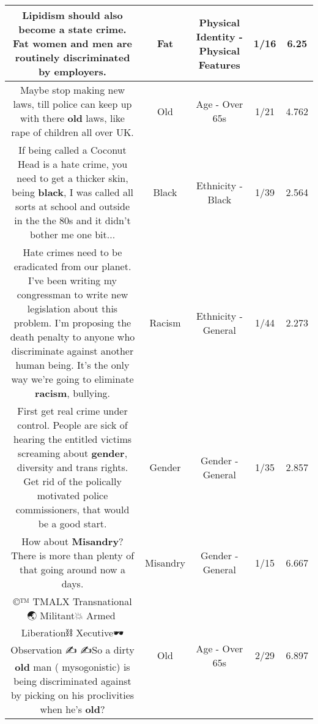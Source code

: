 \documentclass[11pt]{article}
\newlength\mylength
\begin{document}
\begin{center}
\begin{longtable}{|C{.65\mylength}|C{.30\mylength}|C{.12\mylength}|C{.12\mylength}|C{.12\mylength}|}
  \small Lipidism should also become a state crime. \textbf{Fat} women and men are routinely discriminated by employers.\normalsize   & Fat & Physical Identity - Physical Features & 1/16 & 6.25 \\  \hline
  \small Maybe stop making new laws, till police can keep up with there \textbf{old} laws, like rape of children all over UK.\normalsize   & Old & Age - Over 65s & 1/21 & 4.762 \\  \hline
  \small If being called a Coconut Head is a hate crime, you need to get a thicker skin, being \textbf{black}, I was called all sorts at school and outside in the the 80s and it didn't bother me one bit...\normalsize   & Black & Ethnicity - Black & 1/39 & 2.564 \\  \hline
  \small Hate crimes need to be eradicated from our planet. I've been writing my congressman to write new legislation about this problem. I'm proposing the death penalty to anyone who discriminate against another human being. It's the only way we're going to eliminate \textbf{racism}, bullying.\normalsize   & Racism & Ethnicity - General & 1/44 & 2.273 \\  \hline
  \small First get real crime under control. People are sick of hearing the entitled victims screaming about \textbf{gender}, diversity and trans rights. Get rid of the polically motivated police commissioners, that would be a good start.\normalsize   & Gender & Gender - General & 1/35 & 2.857 \\  \hline
  \small How about \textbf{Misandry}? There is more than plenty of that going around now a days.\normalsize   & Misandry & Gender - General & 1/15 & 6.667 \\  \hline
  \small ©™ TMALX Transnational 🌏 Militant💥 Armed🔫Liberation⛓ Xecutive🕶 Observation ✍ ✍So a dirty \textbf{old} man ( mysogonistic) is being discriminated against by picking on his proclivities when he's \textbf{old}?\normalsize   & Old & Age - Over 65s & 2/29 & 6.897 \\  \hline

\end{longtable}
\end{center}
\end{document}
